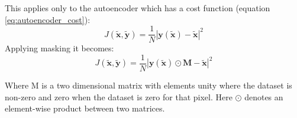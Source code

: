       This applies only to the autoencoder which has a cost function (equation \ref{eq:autoencoder_cost}):
      \begin{equation}
          J(\tilde{\mathbf{x}},\tilde{\mathbf{y}})
          = \frac{1}{N}\left |\mathbf{y}(\tilde{\mathbf{x}})-\tilde{\mathbf{x}}\right | ^2
      \end{equation}
      Applying masking it becomes:
      \begin{equation}
          J(\tilde{\mathbf{x}},\tilde{\mathbf{y}})
          = \frac{1}{N}\left |\mathbf{y}(\tilde{\mathbf{x}}) \odot \mathbf{M}-\tilde{\mathbf{x}}\right | ^2
      \end{equation}

      Where M is a two dimensional matrix with elements unity where the dataset is non-zero
      and zero when the dataset is zero for that pixel. Here $\odot$ denotes an element-wise
      product between two matrices.
